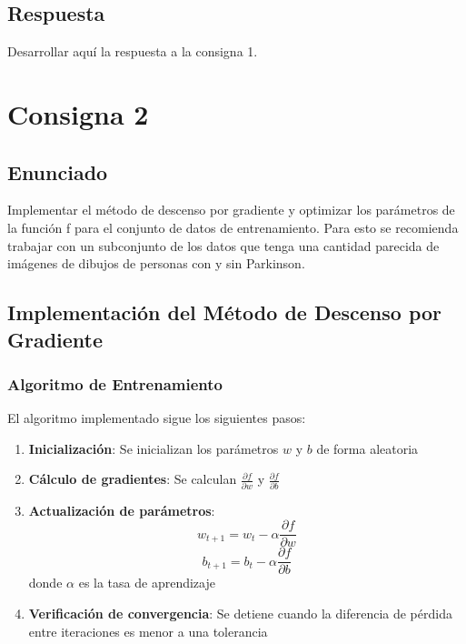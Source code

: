 \documentclass[a4paper,12pt]{article}
\begin{document}
\subsection{Respuesta}
Desarrollar aquí la respuesta a la consigna 1.

\section{Consigna 2}
\subsection{Enunciado}
Implementar el método de descenso por gradiente y optimizar los parámetros de la función f para el conjunto de datos de entrenamiento. Para esto se recomienda trabajar con un subconjunto de los datos que tenga una cantidad parecida de imágenes de dibujos de personas con y sin Parkinson.

\subsection{Implementación del Método de Descenso por Gradiente}

\subsubsection{Algoritmo de Entrenamiento}
El algoritmo implementado sigue los siguientes pasos:

\begin{enumerate}
    \item \textbf{Inicialización}: Se inicializan los parámetros $w$ y $b$ de forma aleatoria
    \item \textbf{Cálculo de gradientes}: Se calculan $\frac{\partial f}{\partial w}$ y $\frac{\partial f}{\partial b}$
    \item \textbf{Actualización de parámetros}: 
    \[ w_{t+1} = w_t - \alpha \frac{\partial f}{\partial w} \]
    \[ b_{t+1} = b_t - \alpha \frac{\partial f}{\partial b} \]
    donde $\alpha$ es la tasa de aprendizaje
    \item \textbf{Verificación de convergencia}: Se detiene cuando la diferencia de pérdida entre iteraciones es menor a una tolerancia
\end{enumerate}
\end{document}
